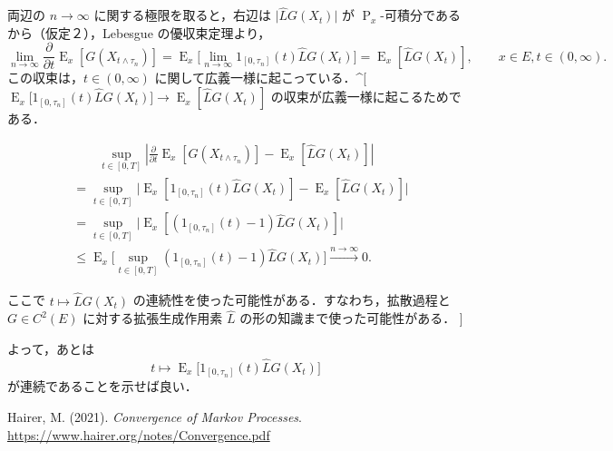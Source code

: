\documentclass[
  11pt,
  jafont=noto-otf]{bxjsarticle}
\newlength{\cslhangindent}
\newenvironment{CSLReferences}[2] %
 {\begin{list}{}{%
  \setlength{\itemindent}{0pt}
  \setlength{\leftmargin}{0pt}
  \setlength{\parsep}{0pt}
  \ifodd #1
   \setlength{\leftmargin}{\cslhangindent}
   \setlength{\itemindent}{-1\cslhangindent}
  \fi
  \setlength{\itemsep}{#2\baselineskip}}}
 {\end{list}}
\begin{document}
\begin{tcolorbox}
両辺の \(n\to\infty\) に関する極限を取ると，右辺は
\(\lvert\widehat{L}G(X_t)\rvert\) が
\(\operatorname{P}_x\)-可積分であるから（仮定２），Lebesgue
の優収束定理より， \[
\lim_{n\to\infty}\frac{\partial }{\partial t}\operatorname{E}_x[G(X_{t\land\tau_n})]=\operatorname{E}_x\biggl[\lim_{n\to\infty}1_{[0,\tau_n]}(t)\widehat{L}G(X_t)\biggr]=\operatorname{E}_x[\widehat{L}G(X_t)],\qquad x\in E,t\in(0,\infty).
\] この収束は，\(t\in(0,\infty)\)
に関して広義一様に起こっている．\^{}{[}\(\operatorname{E}_x\biggl[1_{[0,\tau_n]}(t)\widehat{L}G(X_t)\biggr]\to\operatorname{E}_x[\widehat{L}G(X_t)]\)
の収束が広義一様に起こるためである．

\begin{align*}
&\qquad\sup_{t\in[0,T]}\left|\frac{\partial }{\partial t}\operatorname{E}_x[G(X_{t\land\tau_n})]-\operatorname{E}_x[\widehat{L}G(X_t)]\right|\\
&=\sup_{t\in[0,T]}\biggl|\operatorname{E}_x[1_{[0,\tau_n]}(t)\widehat{L}G(X_t)]-\operatorname{E}_x[\widehat{L}G(X_t)]\biggr|\\
&=\sup_{t\in[0,T]}\biggl|\operatorname{E}_x\left[(1_{[0,\tau_n]}(t)-1)\widehat{L}G(X_t)\right]\biggr|\\
&\le\operatorname{E}_x\biggl[\sup_{t\in[0,T]}\left(1_{[0,\tau_n]}(t)-1\right)\widehat{L}G(X_t)\biggr]\xrightarrow{n\to\infty}0.
\end{align*}

ここで \(t\mapsto\widehat{L}G(X_t)\)
の連続性を使った可能性がある．すなわち，拡散過程と \(G\in C^2(E)\)
に対する拡張生成作用素 \(\widehat{L}\)
の形の知識まで使った可能性がある． {]}

よって，あとは \[
t\mapsto \operatorname{E}_x\biggl[1_{[0,\tau_n]}(t)\widehat{L}G(X_t)\biggr]
\] が連続であることを示せば良い．

\end{tcolorbox}


\label{refs}
\begin{CSLReferences}{1}{0}
Hairer, M. (2021). \emph{Convergence of Markov Processes}.
\url{https://www.hairer.org/notes/Convergence.pdf}

\end{CSLReferences}
\end{document}

